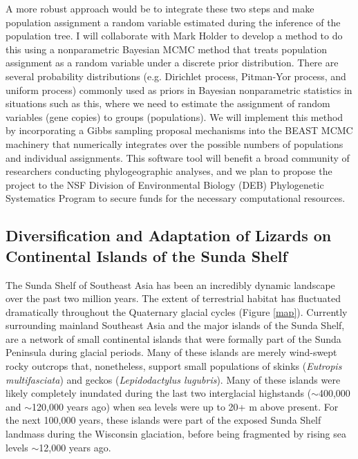 \documentclass[10pt]{article}
\begin{document}
A more robust approach would be to integrate these two steps and make
population assignment a random variable estimated during the inference of the
population tree.
I will collaborate with Mark Holder to develop a method to do this using a
nonparametric Bayesian MCMC method that treats population assignment as a
random variable under a discrete prior distribution.
There are several probability distributions (e.g. Dirichlet process, Pitman-Yor
process, and uniform process) commonly used as priors in Bayesian nonparametric
statistics in situations such as this, where we need to estimate the assignment
of random variables (gene copies) to groups (populations).
We will implement this method by incorporating a Gibbs sampling proposal
mechanisms into the BEAST MCMC machinery that numerically integrates over the
possible numbers of populations and individual assignments.
This software tool will benefit a broad community of researchers conducting
phylogeographic analyses, and we plan to propose the project to the NSF
Division of Environmental Biology (DEB) Phylogenetic Systematics Program to
secure funds for the necessary computational resources.

\subsection*{Diversification and Adaptation of Lizards on Continental Islands
of the Sunda Shelf}
The Sunda Shelf of Southeast Asia has been an incredibly dynamic landscape over
the past two million years.
The extent of terrestrial habitat has fluctuated dramatically throughout the
Quaternary glacial cycles (Figure \ref{map}).
Currently surrounding mainland Southeast Asia and the major islands of the
Sunda Shelf, are a network of small continental islands that were formally part
of the Sunda Peninsula during glacial periods.
Many of these islands are merely wind-swept rocky outcrops that, nonetheless,
support small populations of skinks (\emph{Eutropis multifasciata}) and geckos
(\emph{Lepidodactylus lugubris}).
Many of these islands were likely completely inundated during the last two
interglacial highstands ($\sim$400,000 and $\sim$120,000 years ago) when sea
levels were up to 20+ m above present.
For the next 100,000 years, these islands were part of the exposed Sunda Shelf
landmass during the Wisconsin glaciation, before being fragmented by rising sea
levels $\sim$12,000 years ago.
\end{document}
